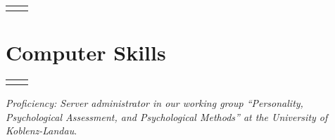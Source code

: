 \documentclass[10pt]{FreemanCV}
\begin{document}
\begin{paracol}{2}
\begin{supertabular}{r l}
	

\end{supertabular}


\section{Computer Skills} 




\begin{supertabular}{r l}
	

	



	
\end{supertabular}

\textit{Proficiency: Server administrator in our working group
\enquote{Personality, Psychological Assessment, and Psychological Methods} at
the University of Koblenz-Landau}.



\end{paracol}
\end{document}
